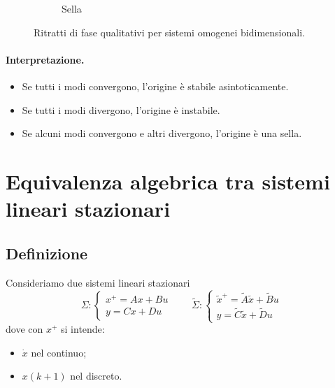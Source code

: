 \begin{figure}[H]
\begin{subfigure}{0.31\textwidth}
\caption{Sella}
\end{subfigure}

\caption{Ritratti di fase qualitativi per sistemi omogenei bidimensionali.}
\label{fig:L10_phase_portraits}
\end{figure}

\paragraph{Interpretazione.}
\begin{itemize}
    \item Se tutti i modi convergono, l'origine è stabile asintoticamente.
    \item Se tutti i modi divergono, l'origine è instabile.
    \item Se alcuni modi convergono e altri divergono, l'origine è una sella.
\end{itemize}

\section{Equivalenza algebrica tra sistemi lineari stazionari}

\subsection{Definizione}

Consideriamo due sistemi lineari stazionari
\[
\Sigma:
\begin{cases}
x^{+}=Ax+Bu\\
y=Cx+Du
\end{cases}
\qquad
\widetilde{\Sigma}:
\begin{cases}
\tilde x^{+}=\tilde A \tilde x+\tilde B u\\
y=\tilde C \tilde x+\tilde D u
\end{cases}
\]
dove con $x^+$ si intende:
\begin{itemize}
    \item $\dot x$ nel continuo;
    \item $x(k+1)$ nel discreto.
\end{itemize}

